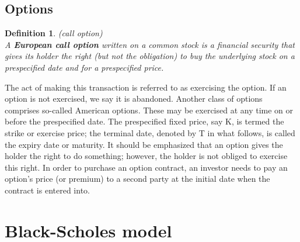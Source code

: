 \documentclass{book}
\newtheorem{definition}{Definition}[section]
\begin{document}
\section{Options}
\begin{definition}(call option)\\
A \textbf{European call option} written on a common stock is a financial security that gives its holder the right (but not the obligation) to buy the underlying stock on a prespecified date and for a prespecified price.
\end{definition}
The act of making this transaction is referred to as exercising the option. If an option is not exercised, we say it is abandoned. Another class of options comprises so-called American options. These may be exercised at any time on or before the prespecified date. The prespecified fixed price, say K, is termed the strike or exercise price; the terminal date, denoted by T in what follows, is called the expiry date or maturity. It should be emphasized that an option gives the holder the right to do something; however, the holder is not obliged to exercise this right. In order to purchase an option contract, an investor needs to pay an option's price (or premium) to a second party at the initial date when the contract is entered into.
\chapter{Black-Scholes model}
\end{document}
